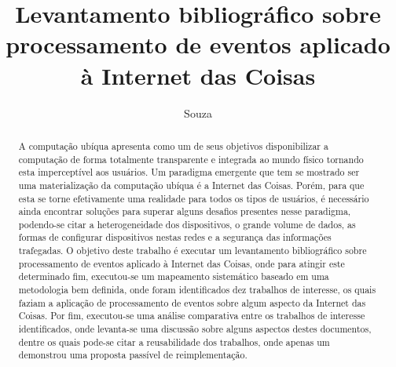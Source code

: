 \documentclass[ti,table]{texufpel} %
\title{Levantamento bibliográfico sobre processamento de eventos aplicado à Internet das Coisas}
\author{Souza}{Weslen Schiavon}
\begin{document}
 

  

\renewcommand{\advisorname}{Orientadora}           %

\renewcommand{\coadvisorname}{Coorientador}      %

  

\maketitle  

  

\sloppy 

  


  

  

\begin{abstract} 

A computação ubíqua apresenta como um de seus objetivos disponibilizar a computação de forma totalmente transparente e integrada ao mundo físico tornando esta imperceptível aos usuários. Um paradigma emergente que tem se mostrado ser uma materialização da computação ubíqua é a Internet das Coisas. Porém, para que esta se torne efetivamente uma realidade para todos os tipos de usuários, é necessário ainda encontrar soluções para superar alguns desafios presentes nesse paradigma, podendo-se citar a heterogeneidade dos dispositivos, o grande volume de dados, as formas de configurar dispositivos nestas redes e a segurança das informações trafegadas. O objetivo deste trabalho é executar um levantamento bibliográfico sobre processamento de eventos aplicado à Internet das Coisas, onde para atingir este determinado fim, executou-se um mapeamento sistemático baseado em uma metodologia bem definida, onde foram identificados dez trabalhos de interesse, os quais faziam a aplicação de processamento de eventos sobre algum aspecto da Internet das Coisas. Por fim, executou-se uma análise comparativa entre os trabalhos de interesse identificados, onde levanta-se uma discussão sobre alguns aspectos destes documentos, dentre os quais pode-se citar a reusabilidade dos trabalhos, onde apenas um demonstrou uma proposta passível de reimplementação. 

\end{abstract} 

  

  
\end{document}
